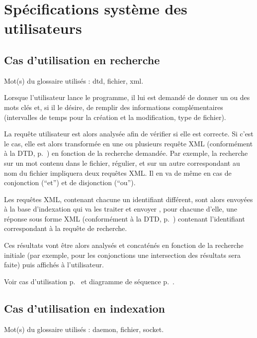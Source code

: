 \section{Spécifications système des utilisateurs}

\subsection{Cas d'utilisation en recherche}
Mot(s) du glossaire utilisés : \gls{dtd}, \gls{fichier}, \gls{xml}.

Lorsque l'utilisateur lance le programme, il lui est demandé de donner un ou des mots clés et, si il le désire, de remplir des informations complémentaires (intervalles de temps pour la création et la modification, type de fichier).

La requête utilisateur est alors analysée afin de vérifier si elle est correcte. Si c'est le cas, elle est alors transformée en une ou plusieurs requête XML (conformément à la DTD, p.~\pageref{dtd_bi_mr_search}) en fonction de la recherche demandée. Par exemple, la recherche sur un mot contenu dans le fichier, régulier, et sur un autre correspondant au nom du fichier impliquera deux requêtes XML. Il en va de même en cas de conjonction (\enquote{et}) et de disjonction (\enquote{ou}).

Les requêtes XML, contenant chacune un identifiant différent, sont alors envoyées à la base d'indexation qui va les traiter et envoyer , pour chacune d'elle, une réponse sous forme XML (conformément à la DTD, p.~\pageref{dtd_bi_mr_result}) contenant l'identifiant correspondant à la requête de recherche.

Ces résultats vont être alors analysés et concaténés en fonction de la recherche initiale (par exemple, pour les conjonctions une intersection des résultats sera faite) puis affichés à l'utilisateur.

Voir cas d'utilisation p.~\pageref{utilisation-recherche} et diagramme de séquence p.~\pageref{sequence-recherche}.

\subsection{Cas d'utilisation en indexation}
Mot(s) du glossaire utilisés : \gls{daemon}, \gls{fichier}, \gls{socket}.

